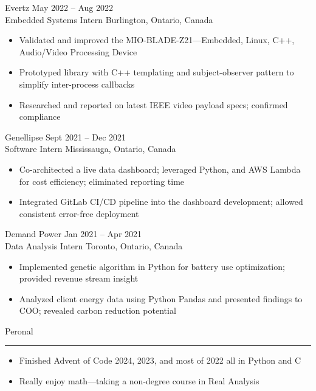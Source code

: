 \documentclass{article}
\newenvironment{mysection}[1]
{ {\large #1}

	\vspace{-1em}
	\rule{\linewidth}{0.4pt} } { \vspace{1em} }
\begin{document}
Evertz \hfill May 2022 – Aug 2022 \\
Embedded Systems Intern \hfill Burlington, Ontario, Canada
\begin{itemize}[noitemsep,left=0pt,label={--}]
	\item Validated and improved the MIO-BLADE-Z21—Embedded, Linux, C++, Audio/Video Processing Device
	\item Prototyped library with C++ templating and subject-observer pattern to simplify inter-process callbacks
	\item Researched and reported on latest IEEE video payload specs; confirmed compliance
\end{itemize}

Genellipse \hfill Sept 2021 – Dec 2021 \\
Software Intern \hfill Mississauga, Ontario, Canada
\begin{itemize}[noitemsep,left=0pt,label={--}]
	\item Co-architected a live data dashboard; leveraged Python, and AWS Lambda for cost efficiency; eliminated reporting time
	\item Integrated GitLab CI/CD pipeline into the dashboard development; allowed consistent error-free deployment
\end{itemize}

Demand Power \hfill Jan 2021 – Apr 2021 \\
Data Analysis Intern \hfill Toronto, Ontario, Canada
\begin{itemize}[noitemsep,left=0pt,label={--}]
	\item Implemented genetic algorithm in Python for battery use optimization; provided revenue stream insight
	\item Analyzed client energy data using Python Pandas and presented findings to COO; revealed carbon reduction potential
\end{itemize}

\begin{mysection}{Peronal}
\begin{itemize}[noitemsep,left=0pt,label={--}]
	\item Finished Advent of Code 2024, 2023, and most of 2022 all in Python and C
	\item Really enjoy math---taking a non-degree course in Real Analysis
\end{itemize}
\end{mysection}
\end{document}
